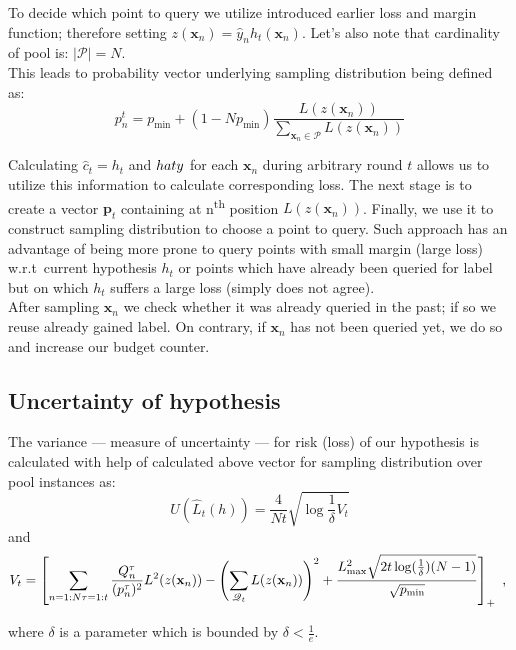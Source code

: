 \documentclass[12pt, a4paper, pdflatex, leqno]{report}
\newcommand{\ts}{\textsuperscript}
\begin{document}
To decide which point to query we utilize introduced earlier loss and margin function; therefore setting $z(\mathbf{x}_n) = \hat{y}_n h_t(\mathbf{x}_n)$. Let's also note that cardinality of pool is: $|\mathscr{P}| = N$.\\
This leads to probability vector underlying sampling distribution being defined as:
$$
p_n^t = p_{\text{min}} + (1-Np_{\text{min}}) \frac{L(z(\mathbf{x}_n))}{\sum_{\mathbf{x}_n \in \mathscr{P}} L(z(\mathbf{x}_n))}
$$

Calculating $\hat{c}_t = h_t$ and $\\hat{y}$ for each $\mathbf{x}_n$ during arbitrary round $t$ allows us to utilize this information to calculate corresponding loss. The next stage is to create a vector $\mathbf{p}_t$ containing at n\ts{th} position $L(z(\mathbf{x}_n))$. Finally, we use it to construct sampling distribution to choose a point to query. Such approach has an advantage of being more prone to query points with small margin (large loss) w.r.t\ current hypothesis $h_t$ or points which have already been queried for label but on which $h_t$ suffers a large loss (simply does not agree).\\

After sampling $\mathbf{x}_n$ we check whether it was already queried in the past; if so we reuse already gained label. On contrary, if $\mathbf{x}_n$ has not been queried yet, we do so and increase our budget counter.


\subsection{Uncertainty of hypothesis\label{sec:uncertanity}}
The variance --- measure of uncertainty --- for risk (loss) of our hypothesis is calculated with help of calculated above vector for sampling distribution over pool instances as:
\begin{equation}\label{eq:variance}
U(\hat{L}_t(h)) = \frac{4}{Nt} \sqrt{\log\frac{1}{\delta}V_t}
\end{equation}
and
$$
V_t = \left[
\sum_{n = 1:N \\ \tau = 1:t} \frac{Q^\tau_n}{(p^\tau_n)^2} L^2(z(\mathbf{x}_n))
-
\left( \sum_{\mathscr{Q}_t} L(z(\mathbf{x}_n)) \right)^2
+
\frac{L^2_{\text{max}}  \sqrt{2t \log(\frac{1}{\delta}) (N-1)} } {\sqrt{p_{\text{min}}}}
\right]_+ \text{~,~}
$$

where $\delta$ is a parameter which is bounded by $\delta < \frac{1}{e}$.\\
\end{document}
